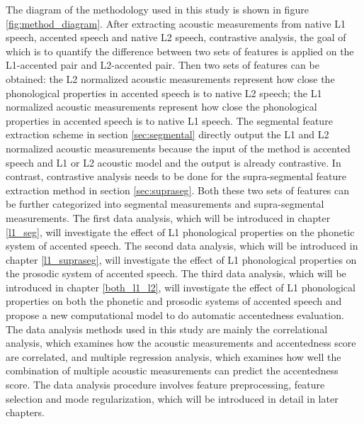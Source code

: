 The diagram of the methodology used in this study is shown in figure \ref{fig:method_diagram}. After extracting acoustic measurements from native L1 speech, accented speech and native L2 speech, contrastive analysis, the goal of which is to quantify the difference between two sets of features is applied on the L1-accented pair and L2-accented pair. Then two sets of features can be obtained: the L2 normalized acoustic measurements represent how close the phonological properties in accented speech is to native L2 speech; the L1 normalized acoustic measurements represent how close the phonological properties in accented speech is to native L1 speech. The segmental feature extraction scheme in section \ref{sec:segmental} directly output the L1 and L2 normalized acoustic measurements because the input of the method is accented speech and L1 or L2 acoustic model and the output is already contrastive. In contrast, contrastive analysis needs to be done for the supra-segmental feature extraction method in section \ref{sec:supraseg}. Both these two sets of features can be further categorized into segmental measurements and supra-segmental measurements. The first data analysis, which will be introduced in chapter \ref{l1_seg}, will investigate the effect of L1 phonological properties on the phonetic system of accented speech.  The second data analysis, which will be introduced in chapter \ref{l1_supraseg}, will investigate the effect of L1 phonological properties on the prosodic system of accented speech. The third data analysis, which will be introduced in chapter \ref{both_l1_l2}, will investigate the effect of L1 phonological properties on both the phonetic and prosodic systems of accented speech and propose a new computational model to do automatic accentedness evaluation. The data analysis methods used in this study are mainly the correlational analysis, which examines how the acoustic measurements and accentedness score are correlated, and multiple regression analysis, which examines how well the combination of multiple acoustic measurements can predict the accentedness score. The data analysis procedure involves feature preprocessing, feature selection and mode regularization, which will be introduced in detail in later chapters. 